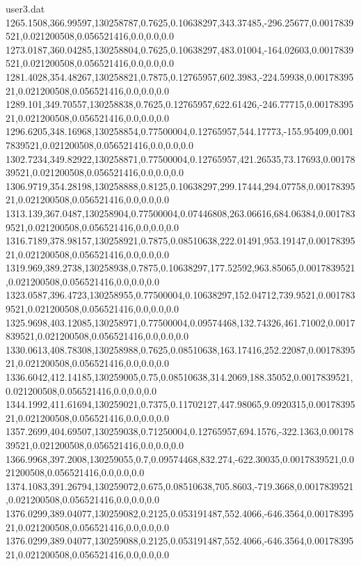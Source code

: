 \begin{filecontents}{user3.dat}
1265.1508,366.99597,130258787,0.7625,0.10638297,343.37485,-296.25677,0.0017839521,0.021200508,0.056521416,0.0,0.0,0.0
1273.0187,360.04285,130258804,0.7625,0.10638297,483.01004,-164.02603,0.0017839521,0.021200508,0.056521416,0.0,0.0,0.0
1281.4028,354.48267,130258821,0.7875,0.12765957,602.3983,-224.59938,0.0017839521,0.021200508,0.056521416,0.0,0.0,0.0
1289.101,349.70557,130258838,0.7625,0.12765957,622.61426,-246.77715,0.0017839521,0.021200508,0.056521416,0.0,0.0,0.0
1296.6205,348.16968,130258854,0.77500004,0.12765957,544.17773,-155.95409,0.0017839521,0.021200508,0.056521416,0.0,0.0,0.0
1302.7234,349.82922,130258871,0.77500004,0.12765957,421.26535,73.17693,0.0017839521,0.021200508,0.056521416,0.0,0.0,0.0
1306.9719,354.28198,130258888,0.8125,0.10638297,299.17444,294.07758,0.0017839521,0.021200508,0.056521416,0.0,0.0,0.0
1313.139,367.0487,130258904,0.77500004,0.07446808,263.06616,684.06384,0.0017839521,0.021200508,0.056521416,0.0,0.0,0.0
1316.7189,378.98157,130258921,0.7875,0.08510638,222.01491,953.19147,0.0017839521,0.021200508,0.056521416,0.0,0.0,0.0
1319.969,389.2738,130258938,0.7875,0.10638297,177.52592,963.85065,0.0017839521,0.021200508,0.056521416,0.0,0.0,0.0
1323.0587,396.4723,130258955,0.77500004,0.10638297,152.04712,739.9521,0.0017839521,0.021200508,0.056521416,0.0,0.0,0.0
1325.9698,403.12085,130258971,0.77500004,0.09574468,132.74326,461.71002,0.0017839521,0.021200508,0.056521416,0.0,0.0,0.0
1330.0613,408.78308,130258988,0.7625,0.08510638,163.17416,252.22087,0.0017839521,0.021200508,0.056521416,0.0,0.0,0.0
1336.6042,412.14185,130259005,0.75,0.08510638,314.2069,188.35052,0.0017839521,0.021200508,0.056521416,0.0,0.0,0.0
1344.1992,411.61694,130259021,0.7375,0.11702127,447.98065,9.0920315,0.0017839521,0.021200508,0.056521416,0.0,0.0,0.0
1357.2699,404.69507,130259038,0.71250004,0.12765957,694.1576,-322.1363,0.0017839521,0.021200508,0.056521416,0.0,0.0,0.0
1366.9968,397.2008,130259055,0.7,0.09574468,832.274,-622.30035,0.0017839521,0.021200508,0.056521416,0.0,0.0,0.0
1374.1083,391.26794,130259072,0.675,0.08510638,705.8603,-719.3668,0.0017839521,0.021200508,0.056521416,0.0,0.0,0.0
1376.0299,389.04077,130259082,0.2125,0.053191487,552.4066,-646.3564,0.0017839521,0.021200508,0.056521416,0.0,0.0,0.0
1376.0299,389.04077,130259088,0.2125,0.053191487,552.4066,-646.3564,0.0017839521,0.021200508,0.056521416,0.0,0.0,0.0
\end{filecontents}